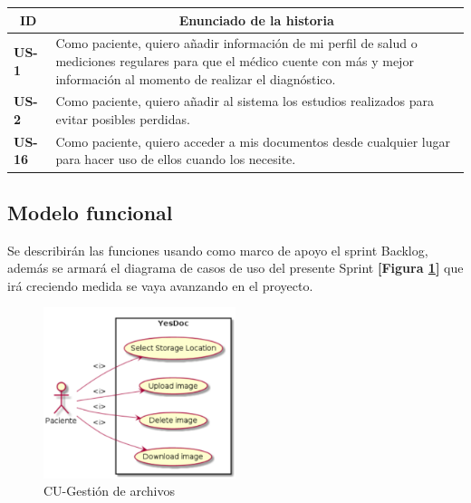 \begin{table}[h]
    \label{US-Sprint7}
    \centering
	\begin{tabular}{|l|p{9cm}|}
	\hline
        \multicolumn{1}{|c|}{\textbf{ID}} &
        \multicolumn{1}{|c|}{\textbf{Enunciado de la historia}} \\          
    \hline
        \textbf{US-1 } & Como paciente, quiero  añadir información de mi perfil de salud o mediciones regulares para que el médico cuente con más y mejor información al momento de realizar el diagnóstico. \\
    \hline
        \textbf{US-2 } & Como paciente, quiero añadir al sistema los estudios realizados para evitar posibles perdidas.\\
     \hline
        \textbf{US-16 } & Como paciente, quiero acceder a mis documentos desde cualquier lugar para hacer uso de ellos cuando los necesite.\\
     \hline   
     
    \end{tabular}
\end{table}

\subsection{Modelo funcional} 
Se describirán las funciones usando como marco de apoyo el sprint Backlog, además se armará el diagrama de casos de uso del presente Sprint \textbf{[Figura \ref{6-cu_file_upload}]} que irá creciendo  medida se vaya avanzando en el proyecto.

    \begin{figure}[h]
        \centering
        \includegraphics[width=0.5\textwidth]{img/cu_file_upload}
        \caption{CU-Gestión de archivos}
		\label{6-cu_file_upload}
    \end{figure}
    
\newpage


